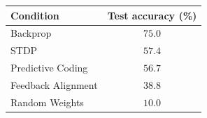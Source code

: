 \begin{tabular}{lc}
\toprule
Condition & Test accuracy (\%) \\
\midrule
Backprop & $75.0$ \\
STDP & $57.4$ \\
Predictive Coding & $56.7$ \\
Feedback Alignment & $38.8$ \\
Random Weights & $10.0$ \\
\bottomrule
\end{tabular}
